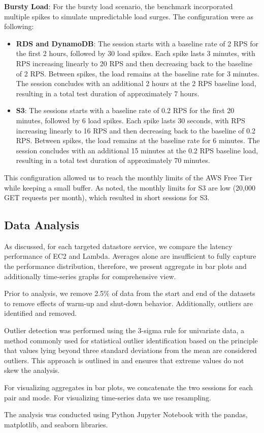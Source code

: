 \textbf{Bursty Load}: For the bursty load scenario, the benchmark incorporated multiple spikes to simulate unpredictable load surges. The configuration were as following:
\begin{itemize}
	\item \textbf{RDS and DynamoDB}: The session starts with a baseline rate of 2 RPS for the first 2 hours, followed by 30 load spikes. Each spike lasts 3 minutes, with RPS increasing linearly to 20 RPS and then decreasing back to the baseline of 2 RPS. Between spikes, the load remains at the baseline rate for 3 minutes. The session concludes with an additional 2 hours at the 2 RPS baseline load, resulting in a total test duration of approximately 7 hours.
	\item \textbf{S3}: The sessions starts with a baseline rate of 0.2 RPS for the first 20 minutes, followed by 6 load spikes. Each spike lasts 30 seconds, with RPS increasing linearly to 16 RPS and then decreasing back to the baseline of 0.2 RPS. Between spikes, the load remains at the baseline rate for 6 minutes. The session concludes with an additional 15 minutes at the 0.2 RPS baseline load, resulting in a total test duration of approximately 70 minutes.
\end{itemize}

This configuration allowed us to reach the monthly limits of the AWS Free Tier while keeping a small buffer. As noted, the monthly limits for S3 are low (20,000 GET requests per month), which resulted in short sessions for S3.

\subsection{Data Analysis}
\label{sec:analysis}

As discussed, for each targeted datastore service, we compare the latency performance of EC2 and Lambda. Averages alone are insufficient to fully capture the performance distribution, therefore, we present aggregate in bar plots and additionally time-series graphs for comprehensive view.

Prior to analysis, we remove 2.5\% of data from the start and end of the datasets to remove effects of warm-up and shut-down behavior. Additionally, outliers are identified and removed.

Outlier detection was performed using the 3-sigma rule for univariate data, a method commonly used for statistical outlier identification based on the principle that values lying beyond three standard deviations from the mean are considered outliers. This approach is outlined in \cite{} and ensures that extreme values do not skew the analysis.

For visualizing aggregates in bar plots, we concatenate the two sessions for each pair and mode. For visualizing time-series data we use resampling.

The analysis was conducted using Python Jupyter Notebook with the pandas, matplotlib, and seaborn libraries.


